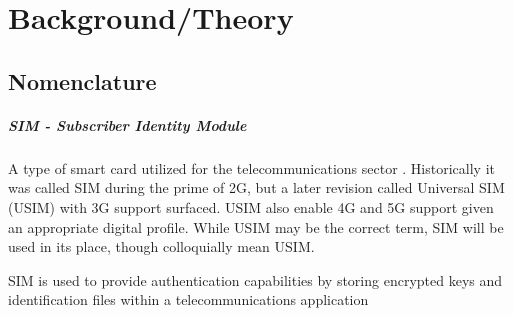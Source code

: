 \chapter{Background/Theory}

\section{Nomenclature}

\paragraph{SIM - Subscriber Identity Module} A type of smart card
utilized for the telecommunications sector \cite{sim}. Historically
it was called SIM during the prime of 2G, but a later revision called
Universal SIM (USIM) with 3G \cite{usim} support surfaced. USIM also
enable 4G and 5G support given an appropriate digital profile. While
USIM may be the correct term, SIM will be used in its place, though
colloquially mean USIM.

SIM is used to provide authentication capabilities by storing
encrypted keys and identification files within a telecommunications
application \cite{sim-application}
